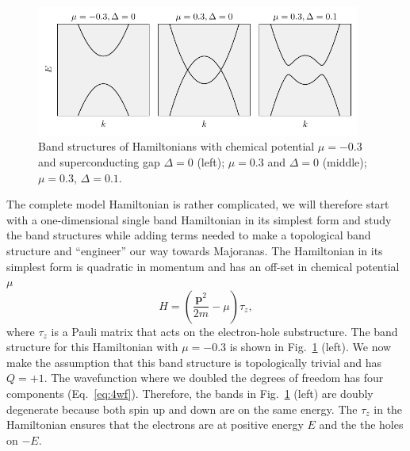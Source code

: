 \begin{figure}
\begin{centering}
\includegraphics[width=0.95\textwidth]{chapter_introduction/figures/triv_topo_bandstructure.pdf}
\par\end{centering}
\caption{Band structures of Hamiltonians with chemical potential $\mu=-0.3$
and superconducting gap $\Delta=0$ (left); $\mu=0.3$ and $\Delta=0$
(middle); $\mu=0.3$, $\Delta=0.1$.
\label{fig:triv_topo_bandstructure}}
\end{figure}

The complete model Hamiltonian is rather complicated, we will therefore start with a one-dimensional single band Hamiltonian in its simplest form and study the band structures while adding terms needed to make a topological band structure and ``engineer'' our way towards Majoranas.
The Hamiltonian in its simplest form is quadratic in momentum and has an off-set in chemical potential $\mu$  \begin{equation}
H=\left(\frac{\bm{p}^{2}}{2m}-\mu\right)\tau_{z},\label{eq:simple_ham}
\end{equation}
where $\tau_{z}$ is a Pauli matrix that acts on the electron-hole substructure.
The band structure for this Hamiltonian with $\mu=-0.3$ is shown in Fig.~\ref{fig:triv_topo_bandstructure} (left).
We now make the assumption that this band structure is topologically trivial and has $Q=+1$.
The wavefunction where we doubled the degrees of freedom has four components (Eq.~\ref{eq:4wf}).
Therefore, the bands in Fig.~\ref{fig:triv_topo_bandstructure} (left) are doubly degenerate because both spin up and down are on the same energy.
The $\tau_{z}$ in the Hamiltonian ensures that the electrons are at positive energy $E$ and the the holes on $-E$.


